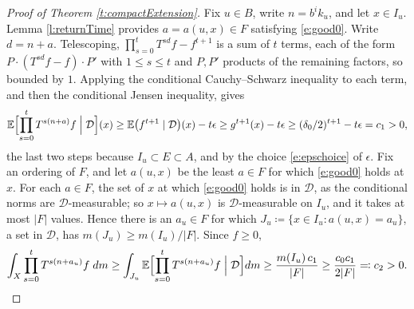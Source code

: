\begin{proof}[Proof of Theorem \ref{t:compactExtension}]
Fix $u \in B$, write $n = b ^{i} k_u$, and let $x \in I_u$.  Lemma \ref{l:returnTime} provides $a = a(u,x) \in F$ satisfying \eqref{e:good0}.  
Write $d = n+a$.  Telescoping, $\prod _{s=0}^{t} T ^{sd}f - f ^{t+1}$ is a sum of $t$ terms, each of the form 
$P \cdot (T ^{sd}f - f) \cdot P'$ with $1\leq s \leq t$ and $P, P'$ products of the remaining factors, so bounded by $1$.  
Applying the conditional Cauchy--Schwarz inequality to each term, and then the conditional Jensen inequality, gives 
\begin{equation}
\mathbb E \Bigl[ \prod _{s=0}^{t} T ^{s(n+a)}f \;\Big\vert\; \mathcal D \Bigr](x) 
\geq \mathbb E \bigl( f ^{t+1} \mid \mathcal D\bigr)(x) - t \epsilon 
\geq g ^{t+1}(x) - t\epsilon 
\geq (\delta _0/2) ^{t+1} - t \epsilon = c_1 >0, 
\end{equation}
the last two steps because $I_u \subset E \subset A$, and by the choice \eqref{e:epschoice} of $\epsilon$.  
Fix an ordering of $F$, and let $a(u,x)$ be the least $a \in F$ for which \eqref{e:good0} holds at $x$.  
For each $a \in F$, the set of $x$ at which \eqref{e:good0} holds is in $\mathcal D$, as the conditional norms are $\mathcal D$-measurable; 
so $x \mapsto a(u,x)$ is $\mathcal D$-measurable on $I_u$, and it takes at most $\lvert F\rvert$ values.  
Hence there is an $a_u \in F$ for which $J_u \coloneqq \{ x \in I_u \colon a(u,x) = a_u\}$, a set in $\mathcal D$, has $m(J_u) \geq m(I_u)/\lvert F\rvert$.  
Since $f \geq 0$, 
\begin{equation} \label{e:lowerbound}
\int_X \prod _{s=0}^{t} T ^{s(n+a_u)}f \;dm 
\geq \int _{J_u} \mathbb E \Bigl[ \prod _{s=0}^{t} T ^{s(n+a_u)}f \;\Big\vert\; \mathcal D \Bigr] dm 
\geq \frac{m(I_u)\, c_1}{\lvert F\rvert} \geq \frac{c_0c_1}{2 \lvert F\rvert} \eqqcolon c_2 >0 . 
\end{equation}


\end{proof}
